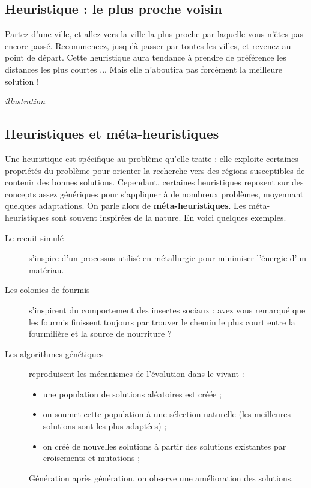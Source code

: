 \documentclass[a5paper,pagesize,DIV=14]{scrbook}
\begin{document}
\subsection*{Heuristique : le plus proche voisin}

Partez d'une ville, et allez vers la ville la plus proche par laquelle vous n'êtes pas encore passé. Recommencez, jusqu'à passer par toutes les villes, et revenez au point de départ. Cette heuristique aura tendance à prendre de préférence les distances les plus courtes ... Mais elle n'aboutira pas forcément la meilleure solution !

\begin{center}
  \textit{illustration}
\end{center}

\subsection*{Heuristiques et méta-heuristiques}

Une heuristique est spécifique au problème qu'elle traite : elle exploite certaines propriétés du problème pour orienter la recherche vers des \og régions \fg susceptibles de contenir des bonnes solutions. Cependant, certaines heuristiques reposent sur des concepts assez génériques pour s'appliquer à de nombreux problèmes, moyennant quelques adaptations. On parle alors de \textbf{méta-heuristiques}. Les méta-heuristiques sont souvent inspirées de la nature. En voici quelques exemples.

\begin{description}
  \item[Le recuit-simulé] s'inspire d'un processus utilisé en métallurgie pour minimiser l'énergie d'un matériau.
  \item[Les colonies de fourmis] s'inspirent du comportement des insectes sociaux : avez vous remarqué que les fourmis finissent toujours par trouver le chemin le plus court entre la fourmilière et la source de nourriture ?
  \item[Les algorithmes génétiques] reproduisent les mécanismes de l'évolution dans le vivant :
    \begin{itemize}
      \item une population de solutions aléatoires est créée ;
      \item on soumet cette population à une sélection naturelle (les meilleures solutions sont les plus adaptées) ;
      \item on créé de nouvelles solutions à partir des solutions existantes par croisements et mutations ;
    \end{itemize}
    Génération après génération, on observe une amélioration des solutions.
\end{description}
\end{document}
